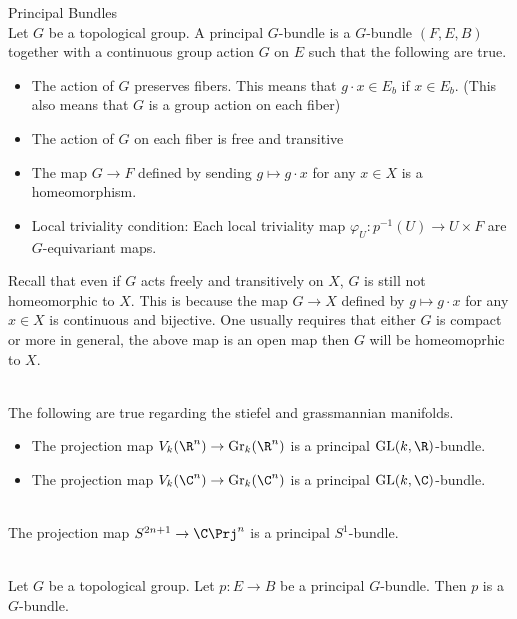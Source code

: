 \documentclass[a4paper]{article}
\begin{document}
\begin{defn}{Principal Bundles}{}\\
Let $G$ be a topological group. A principal $G$-bundle is a $G$-bundle $(F,E,B)$ together with a continuous group action $G$ on $E$ such that the following are true. 
\begin{itemize}
\item The action of $G$ preserves fibers. This means that $g\cdot x\in E_b$ if $x\in E_b$. (This also means that $G$ is a group action on each fiber)
\item The action of $G$ on each fiber is free and transitive
\item The map $G\to F$ defined by sending $g\mapsto g\cdot x$ for any $x\in X$ is a homeomorphism. 
\item Local triviality condition: Each local triviality map $\varphi_U:p^{-1}(U)\to U\times F$ are $G$-equivariant maps. 
\end{itemize}
\end{defn}

Recall that even if $G$ acts freely and transitively on $X$, $G$ is still not homeomorphic to $X$. This is because the map $G\to X$ defined by $g\mapsto g\cdot x$ for any $x\in X$ is continuous and bijective. One usually requires that either $G$ is compact or more in general, the above map is an open map then $G$ will be homeomoprhic to $X$. 

\begin{eg}{}{}\\
The following are true regarding the stiefel and grassmannian manifolds. 
\begin{itemize}
\item The projection map $V_k(\R^n)\to\text{Gr}_k(\R^n)$ is a principal $\text{GL}(k,\R)$-bundle. 
\item The projection map $V_k(\C^n)\to\text{Gr}_k(\C^n)$ is a principal $\text{GL}(k,\C)$-bundle. 
\end{itemize}
\end{eg}

\begin{eg}{}{}\\
The projection map $S^{2n+1}\to\C\Prj^n$ is a principal $S^1$-bundle. 
\end{eg}

\begin{lmm}{}{}\\
Let $G$ be a topological group. Let $p:E\to B$ be a principal $G$-bundle. Then $p$ is a $G$-bundle. 
\end{lmm}
\end{document}
